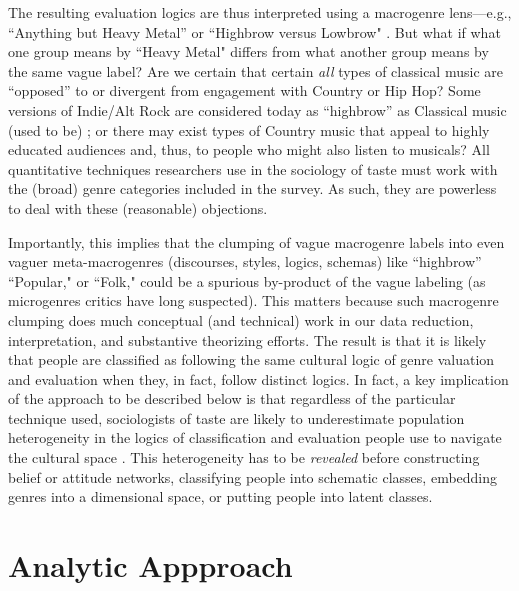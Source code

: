 \documentclass[a4paper,12pt]{extarticle}
\begin{document}
The resulting evaluation logics are thus interpreted using a macrogenre lens---e.g., ``Anything but Heavy Metal'' or ``Highbrow versus Lowbrow" \citep[e.g.,][]{goldberg2011mapping, willekens2022cultural}. But what if what one group means by ``Heavy Metal" differs from what another group means by the same vague label? Are we certain that certain {\em all} types of classical music are ``opposed'' to or divergent from engagement with Country or Hip Hop? Some versions of Indie/Alt Rock are considered today as ``highbrow'' as Classical music (used to be) \citep{Van_Poecke2018}; or there may exist types of Country music that appeal to highly educated audiences and, thus, to people who might also listen to musicals? All quantitative techniques researchers use in the sociology of taste must work with the (broad) genre categories included in the survey. As such, they are powerless to deal with these (reasonable) objections. 

Importantly, this implies that the clumping of vague macrogenre labels into even vaguer meta-macrogenres (discourses, styles, logics, schemas) like ``highbrow'' ``Popular," or ``Folk," could be a spurious by-product of the vague labeling (as microgenres critics have long suspected). This matters because such macrogenre clumping does much conceptual (and technical) work in our data reduction, interpretation, and substantive theorizing efforts. The result is that it is likely that people are classified as following the same cultural logic of genre valuation and evaluation when they, in fact, follow distinct logics. In fact, a key implication of the approach to be described below is that regardless of the particular technique used, sociologists of taste are likely to underestimate population heterogeneity in the logics of classification and evaluation people use to navigate the cultural space \citep{lahire2008individual}. This heterogeneity has to be {\em revealed} before constructing belief or attitude networks, classifying people into schematic classes, embedding genres into a dimensional space, or putting people into latent classes.

\section{Analytic Appproach}
\end{document}

